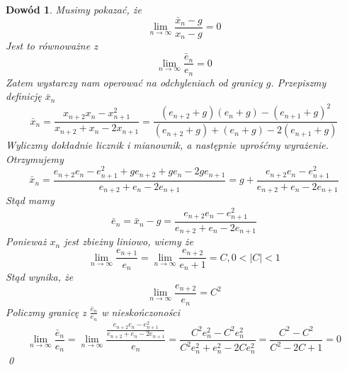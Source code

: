 \documentclass{article}
\newtheorem*{dd}{Dowód}
\begin{document}
\begin{dd}
\normalfont Musimy pokazać, że
\begin{equation*}
\lim_{n \to \infty} \frac{\bar{x}_n - g}{x_n - g} = 0
\end{equation*}
Jest to równoważne z
\begin{equation*}
\lim_{n \to \infty} \frac{\bar{e}_n}{e_n} = 0
\end{equation*}
Zatem wystarczy nam operować na odchyleniach od granicy $g$. Przepiszmy definicję ${\bar{x}_n}$
\begin{equation*}
\bar{x}_n = \frac{x_{n+2}x_n - x_{n+1}^2}{x_{n+2} + x_n - 2x_{n+1}} = \frac{(e_{n+2} + g)(e_n + g) - (e_{n+1} + g)^2}{(e_{n+2} + g) + (e_n + g) - 2(e_{n+1} + g)} 
\end{equation*}
Wyliczmy dokładnie licznik i mianownik, a następnie uprośćmy wyrażenie. Otrzymujemy
\begin{equation*}
\bar{x}_n = \frac{e_{n+2}e_n - e_{n+1}^2 + ge_{n+2} + ge_n - 2ge_{n+1}}{e_{n+2} + e_n - 2e_{n+1}} = g + \frac{e_{n+2}e_n - e_{n+1}^2}{e_{n+2} + e_n - 2e_{n+1}} 
\end{equation*}
Stąd mamy
\begin{equation*}
\bar{e}_n = \bar{x}_n - g = \frac{e_{n+2}e_n - e_{n+1}^2}{e_{n+2} + e_n - 2e_{n+1}} 
\end{equation*}
Ponieważ ${x_n}$ jest zbieżny liniowo, wiemy że
\begin{equation*}
\lim_{n \to \infty} \frac{e_{n+1}}{e_n} = \lim_{n \to \infty} \frac{e_{n+2}}{e_n+1} = C , 0 < |C| < 1
\end{equation*}
Stąd wynika, że 
\begin{equation*}
\lim_{n \to \infty} \frac{e_{n+2}}{e_n} = C^2
\end{equation*}
Policzmy granicę z $\frac{\bar{e}_n}{e_n}$ w nieskończoności
\begin{equation*}
\lim_{n \to \infty} \frac{\bar{e}_n}{e_n} = \lim_{n \to \infty} \frac{\frac{e_{n+2}e_n - e_{n+1}^2}{e_{n+2} + e_n - 2e_{n+1}} }{e_n} = \frac{C^2 e_n^2 - C^2 e_n^2}{C^2 e_n^2 + e_n^2 - 2C e_n^2} = \frac{C^2 - C^2}{C^2 - 2C + 1} = 0
\end{equation*}
\qed
\end{dd}
\end{document}
